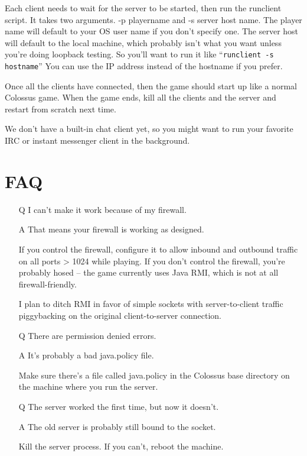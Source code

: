 \documentclass{article}
\begin{document}
Each client needs to wait for the server to be started, then run
the runclient script.  It takes two arguments.  -p playername and
-s server host name.  The player name will default to your OS user
name if you don't specify one.  The server host will default to the
local machine, which probably isn't what you want unless you're doing
loopback testing.  So you'll want to run it like
``\texttt{runclient -s hostname}''
You can use the IP address instead of the hostname if you prefer.

Once all the clients have connected, then the game should start up like
a normal Colossus game.  When the game ends, kill all the clients and
the server and restart from scratch next time.

We don't have a built-in chat client yet, so you might want to run
your favorite IRC or instant messenger client in the background. 


\section{FAQ}

\begin{itemize}

\item[Q] I can't make it work because of my firewall.

\item[A] That means your firewall is working as designed.

   If you control the firewall, configure it to allow inbound and 
   outbound traffic on all ports > 1024 while playing.  If you don't 
   control the firewall, you're probably hosed -- the game currently
   uses Java RMI, which is not at all firewall-friendly.
   
   I plan to ditch RMI in favor of simple sockets with server-to-client 
   traffic piggybacking on the original client-to-server connection.

\item[Q] There are permission denied errors.

\item[A] It's probably a bad java.policy file.  

   Make sure there's a file called java.policy in the Colossus 
   base directory on the machine where you run the server.

\item[Q] The server worked the first time, but now it doesn't.
   
\item[A] The old server is probably still bound to the socket.

   Kill the server process.  If you can't, reboot the machine. 

\end{itemize}
\end{document}
